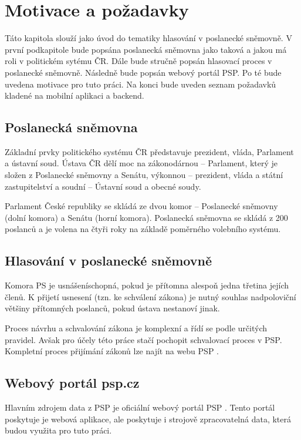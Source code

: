 \chapter{Motivace a požadavky}

\begin{chapterabstract}
Táto kapitola slouží jako úvod do tematiky hlasování v poslanecké sněmovně. V první podkapitole bude popsána poslanecká sněmovna jako taková a jakou má roli v politickém sytému ČR. Dále bude stručně popsán hlasovací proces v poslanecké sněmovně. Následně bude popsán webový portál PSP. Po té bude uvedena motivace pro tuto práci. Na konci bude uveden seznam požadavků kladené na mobilní aplikaci a backend.
\end{chapterabstract}

\section{Poslanecká sněmovna}
Základní prvky politického systému ČR představuje prezident, vláda, Parlament a ústavní soud. Ústava ČR dělí moc na zákonodárnou – Parlament, který je složen z Poslanecké sněmovny \linebreak a Senátu, výkonnou – prezident, vláda a státní zastupitelství a soudní – Ústavní soud a obecné soudy.

Parlament České republiky se skládá ze dvou komor – Poslanecké sněmovny (dolní komora) \linebreak a Senátu (horní komora). Poslanecká sněmovna se skládá z 200 poslanců a je volena na čtyři roky na základě poměrného volebního systému.

\section{Hlasování v poslanecké sněmovně}
Komora PS je usnášeníschopná, pokud je přítomna alespoň jedna třetina jejích členů. K přijetí usnesení (tzn. ke schválení zákona) je nutný souhlas nadpoloviční většiny přítomných poslanců, pokud ústava nestanoví jinak.

Proces návrhu a schvalování zákona je komplexní a řídí se podle určitých pravidel. Avšak pro účely této práce stačí pochopit schvalovací proces v PSP. Kompletní proces přijímání zákonů lze najít na webu PSP \cite{psp-vote-process}.

\section{Webový portál psp.cz}
Hlavním zdrojem data z PSP je oficiální webový portál PSP \cite{psp}. Tento portál poskytuje je webová aplikace, ale poskytuje i strojově zpracovatelná data, která budou využita pro tuto práci.

